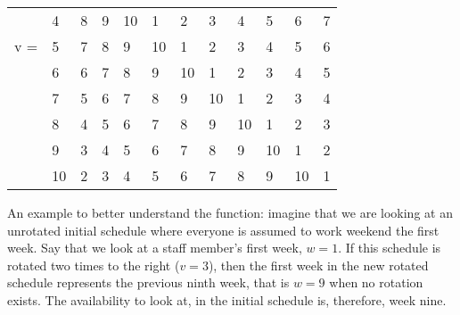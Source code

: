 \begin{table}[H]
\begin{tabular}{llllllllllll}
    & \multicolumn{1}{l|}{4}  & \multicolumn{1}{l|}{8}  & \multicolumn{1}{l|}{9}  & \multicolumn{1}{l|}{10} & \multicolumn{1}{l|}{1}  & \multicolumn{1}{l|}{2}  & \multicolumn{1}{l|}{3}  & \multicolumn{1}{l|}{4}  & \multicolumn{1}{l|}{5}  & \multicolumn{1}{l|}{6}  & \multicolumn{1}{l|}{7}  \\ \cline{3-12} 
v = & \multicolumn{1}{l|}{5}  & \multicolumn{1}{l|}{7}  & \multicolumn{1}{l|}{8}  & \multicolumn{1}{l|}{9}  & \multicolumn{1}{l|}{10} & \multicolumn{1}{l|}{1}  & \multicolumn{1}{l|}{2}  & \multicolumn{1}{l|}{3}  & \multicolumn{1}{l|}{4}  & \multicolumn{1}{l|}{5}  & \multicolumn{1}{l|}{6}  \\ \cline{3-12} 
    & \multicolumn{1}{l|}{6}  & \multicolumn{1}{l|}{6}  & \multicolumn{1}{l|}{7}  & \multicolumn{1}{l|}{8}  & \multicolumn{1}{l|}{9}  & \multicolumn{1}{l|}{10} & \multicolumn{1}{l|}{1}  & \multicolumn{1}{l|}{2}  & \multicolumn{1}{l|}{3}  & \multicolumn{1}{l|}{4}  & \multicolumn{1}{l|}{5}  \\ \cline{3-12} 
    & \multicolumn{1}{l|}{7}  & \multicolumn{1}{l|}{5}  & \multicolumn{1}{l|}{6}  & \multicolumn{1}{l|}{7}  & \multicolumn{1}{l|}{8}  & \multicolumn{1}{l|}{9}  & \multicolumn{1}{l|}{10} & \multicolumn{1}{l|}{1}  & \multicolumn{1}{l|}{2}  & \multicolumn{1}{l|}{3}  & \multicolumn{1}{l|}{4}  \\ \cline{3-12} 
    & \multicolumn{1}{l|}{8}  & \multicolumn{1}{l|}{4}  & \multicolumn{1}{l|}{5}  & \multicolumn{1}{l|}{6}  & \multicolumn{1}{l|}{7}  & \multicolumn{1}{l|}{8}  & \multicolumn{1}{l|}{9}  & \multicolumn{1}{l|}{10} & \multicolumn{1}{l|}{1}  & \multicolumn{1}{l|}{2}  & \multicolumn{1}{l|}{3}  \\ \cline{3-12} 
    & \multicolumn{1}{l|}{9}  & \multicolumn{1}{l|}{3}  & \multicolumn{1}{l|}{4}  & \multicolumn{1}{l|}{5}  & \multicolumn{1}{l|}{6}  & \multicolumn{1}{l|}{7}  & \multicolumn{1}{l|}{8}  & \multicolumn{1}{l|}{9}  & \multicolumn{1}{l|}{10} & \multicolumn{1}{l|}{1}  & \multicolumn{1}{l|}{2}  \\ \cline{3-12} 
    & \multicolumn{1}{l|}{10} & \multicolumn{1}{l|}{2}  & \multicolumn{1}{l|}{3}  & \multicolumn{1}{l|}{4}  & \multicolumn{1}{l|}{5}  & \multicolumn{1}{l|}{6}  & \multicolumn{1}{l|}{7}  & \multicolumn{1}{l|}{8}  & \multicolumn{1}{l|}{9}  & \multicolumn{1}{l|}{10} & \multicolumn{1}{l|}{1}  \\ \cline{3-12} 
\end{tabular}
\end{table}
An example to better understand the function: imagine that we are looking at an unrotated initial schedule where everyone is assumed to work weekend the first week. Say that we look at a staff member's first week, $w=1$. If this schedule is rotated two times to the right ($v=3$), then the first week in the new rotated schedule represents the previous ninth week, that is $w=9$ when no rotation exists. The availability to look at, in the initial schedule is, therefore, week nine.

